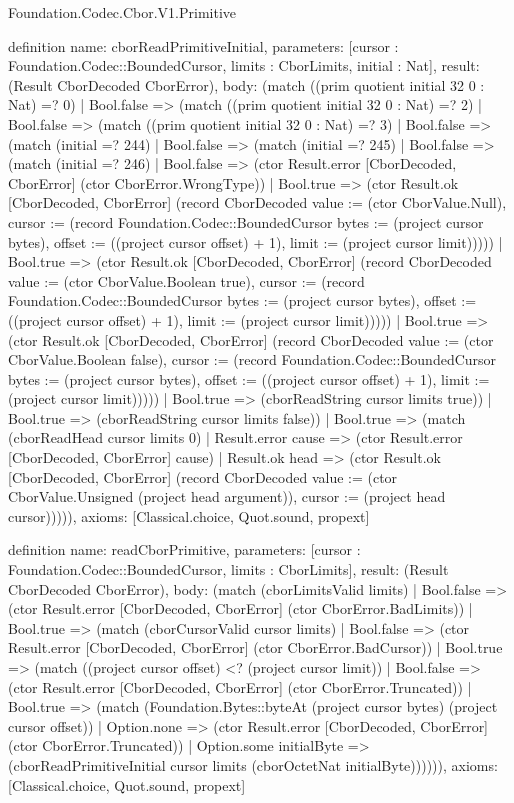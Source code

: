 \begin{lexlean}{Foundation.Codec.Cbor.V1.Primitive}
\begin{semanticmodule}
definition{
  name: cborReadPrimitiveInitial,
  parameters: [cursor : Foundation.Codec::BoundedCursor, limits : CborLimits, initial : Nat],
  result: (Result CborDecoded CborError),
  body: (match ((prim quotient initial 32 0 : Nat) =? 0)
    | Bool.false => (match ((prim quotient initial 32 0 : Nat) =? 2)
      | Bool.false => (match ((prim quotient initial 32 0 : Nat) =? 3)
        | Bool.false => (match (initial =? 244)
          | Bool.false => (match (initial =? 245)
            | Bool.false => (match (initial =? 246)
              | Bool.false => (ctor Result.error [CborDecoded, CborError] (ctor CborError.WrongType))
              | Bool.true => (ctor Result.ok [CborDecoded, CborError] (record CborDecoded {value := (ctor CborValue.Null), cursor := (record Foundation.Codec::BoundedCursor {bytes := (project cursor bytes), offset := ((project cursor offset) + 1), limit := (project cursor limit)})})))
            | Bool.true => (ctor Result.ok [CborDecoded, CborError] (record CborDecoded {value := (ctor CborValue.Boolean true), cursor := (record Foundation.Codec::BoundedCursor {bytes := (project cursor bytes), offset := ((project cursor offset) + 1), limit := (project cursor limit)})})))
          | Bool.true => (ctor Result.ok [CborDecoded, CborError] (record CborDecoded {value := (ctor CborValue.Boolean false), cursor := (record Foundation.Codec::BoundedCursor {bytes := (project cursor bytes), offset := ((project cursor offset) + 1), limit := (project cursor limit)})})))
        | Bool.true => (cborReadString cursor limits true))
      | Bool.true => (cborReadString cursor limits false))
    | Bool.true => (match (cborReadHead cursor limits 0)
      | Result.error cause => (ctor Result.error [CborDecoded, CborError] cause)
      | Result.ok head => (ctor Result.ok [CborDecoded, CborError] (record CborDecoded {value := (ctor CborValue.Unsigned (project head argument)), cursor := (project head cursor)})))),
  axioms: [Classical.choice, Quot.sound, propext]
}

definition{
  name: readCborPrimitive,
  parameters: [cursor : Foundation.Codec::BoundedCursor, limits : CborLimits],
  result: (Result CborDecoded CborError),
  body: (match (cborLimitsValid limits)
    | Bool.false => (ctor Result.error [CborDecoded, CborError] (ctor CborError.BadLimits))
    | Bool.true => (match (cborCursorValid cursor limits)
      | Bool.false => (ctor Result.error [CborDecoded, CborError] (ctor CborError.BadCursor))
      | Bool.true => (match ((project cursor offset) <? (project cursor limit))
        | Bool.false => (ctor Result.error [CborDecoded, CborError] (ctor CborError.Truncated))
        | Bool.true => (match (Foundation.Bytes::byteAt (project cursor bytes) (project cursor offset))
          | Option.none => (ctor Result.error [CborDecoded, CborError] (ctor CborError.Truncated))
          | Option.some initialByte => (cborReadPrimitiveInitial cursor limits (cborOctetNat initialByte)))))),
  axioms: [Classical.choice, Quot.sound, propext]
}


\end{semanticmodule}
\end{lexlean}
